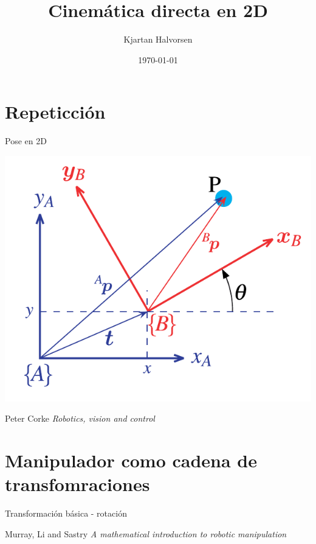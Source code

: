 \documentclass[presentation,aspectratio=169]{beamer}
\author{Kjartan Halvorsen}
\date{\today}
\title{Cinemática directa en 2D}
\begin{document}
\maketitle

\section{Repeticción}
\label{sec:orgaeea6d4}
\begin{frame}[label={sec:orgeafcedf}]{Pose en 2D}
\begin{center}
\includegraphics[height=0.5\textheight]{../figures/Corke-fig2.6.png}

\footnotesize Peter Corke \emph{Robotics, vision and control}
\end{center}
\end{frame}

\section{Manipulador como cadena de transfomraciones}
\label{sec:org0272cc6}

\begin{frame}[label={sec:org84d6fbc}]{Transformación básica - rotación}
\begin{center}

\footnotesize Murray, Li and Sastry \emph{A mathematical introduction to robotic manipulation}
\end{center}
\end{frame}
\end{document}
